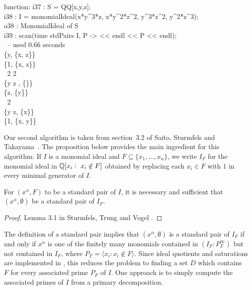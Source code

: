 \Mtwo function:
\beginOutput
i37 : S = QQ[x,y,z];\\
\endOutput
\beginOutput
i38 : I = monomialIdeal(x*y^3*z, x*y^2*z^2, y^3*z^2, y^2*z^3);\\
\emptyLine
o38 : MonomialIdeal of S\\
\endOutput
\beginOutput
i39 : scan(time stdPairs I, P -> << endl << P << endl);\\
\     -- used 0.66 seconds\\
\emptyLine
\{y, \{x, z\}\}\\
\emptyLine
\{1, \{x, z\}\}\\
\emptyLine
\  2 2\\
\{y z , \{\}\}\\
\emptyLine
\{z, \{y\}\}\\
\emptyLine
\  2\\
\{y z, \{x\}\}\\
\emptyLine
\{1, \{x, y\}\}\\
\endOutput

Our second algorithm is taken from section~3.2 of Saito, Sturmfels and
Takayama~\cite{MR1734566}.  The proposition below provides the main
ingredient for this algorithm.  If $I$ is a monomial ideal and $F
\subseteq \{ x_{1},\dotsc, x_{n} \}$, we write $I_F$ for the monomial
ideal in ${\mathbb Q}[x_i : \text{ $x_{i} \notin F$}]$ obtained by replacing
each $x_{i} \in F$ with $1$ in every minimal generator of $I$.

\begin{proposition} 
For $(x^{\alpha}, F)$ to be a standard pair of $I$, it is necessary
and sufficient that $(x^{\alpha}, \emptyset)$ be a standard pair of
$I_F$.
\end{proposition}

\begin{proof} 
Lemma 3.1 in Sturmfels, Trung and Vogel \cite{MR96i:13029}.
\end{proof}

The definition of a standard pair implies that
$(x^{\alpha}, \emptyset)$ is a standard pair of $I_F$ if and only if
$x^{\alpha}$ is one of the finitely many monomials contained in $(I_F
: P_F^\infty)$ but not contained in $I_F$, where $P_F = \langle x_i:
x_i \notin F \rangle$.  Since ideal quotients and saturations are
implemented in \Mtwo, this reduces the problem to finding a set $D$
which contains $F$ for every associated prime $P_{F}$ of $I$.  One
approach is to simply compute the associated primes of $I$ from a
primary decomposition.

